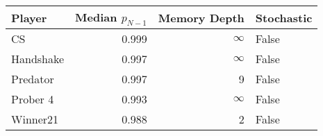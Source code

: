 \begin{tabular}{lrrl}
\toprule
    Player &  Median $p_{N-1}$ &  Memory Depth & Stochastic \\
\midrule
        CS &             0.999 &            \(\infty\) &      False \\
 Handshake &             0.997 &            \(\infty\) &      False \\
  Predator &             0.997 &             9 &      False \\
  Prober 4 &             0.993 &            \(\infty\) &      False \\
  Winner21 &             0.988 &             2 &      False \\
\bottomrule
\end{tabular}
